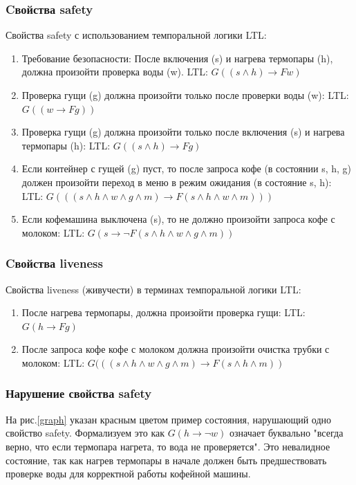 \documentclass[xcolor={dvipsnames}]{beamer}
\begin{document}
\begin{frame}
\frametitle{Cвойства safety}

    Свойства safety  с использованием темпоральной логики LTL:
\begin{enumerate}

\item Требование безопасности: После включения (s) и нагрева термопары (h), должна произойти проверка воды (w).
   LTL: $G((s \land h) \rightarrow Fw)$

\item Проверка гущи (g) должна произойти только после проверки воды (w):
   LTL: $G((w \rightarrow Fg))$

\item Проверка гущи (g) должна произойти только после включения (s) и нагрева термопары (h):
   LTL: $G((s \land h) \rightarrow Fg)$

\item Если контейнер с гущей (g) пуст, то после запроса кофе (в состоянии s, h, g) должен произойти переход в меню в режим ожидания (в состояние s, h):
   LTL: $G(((s \land h \land w \land g \land m) \rightarrow F(s \land h \land w \land m)))$

\item Если кофемашина выключена (s), то не должно произойти запроса кофе с молоком:
   LTL: $G(s \rightarrow \neg F(s \land h \land w \land g \land m))$

\end{enumerate}

    \end{frame}


\begin{frame}
\frametitle{Cвойства liveness}

Свойства liveness (живучести) в терминах темпоральной логики LTL:

\begin{enumerate}
    \item После нагрева термопары, должна произойти проверка гущи:
   LTL: $G(h \rightarrow Fg)$

    \item  После запроса  кофе кофе с молоком должна произойти очистка трубки с молоком:
   LTL: $G(((s \land h \land w \land g \land m) \rightarrow F(s \land h \land m))$


\end{enumerate}
    
    
\end{frame}


\begin{frame}
\frametitle{Нарушение свойства safety}

На рис.\ref{graph} указан красным цветом пример состояния, нарушающий одно свойство safety. Формализуем это как
$G(h \rightarrow \neg w)$ означает буквально "всегда верно, что если термопара нагрета, то вода не проверяется". Это невалидное состояние, так как нагрев термопары в начале должен быть предшествовать проверке воды для корректной работы кофейной машины.


\end{frame}
\end{document}
